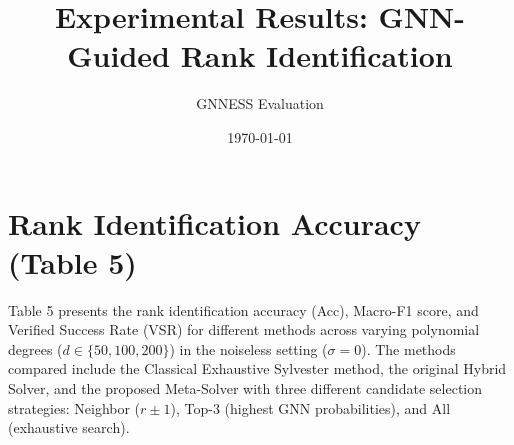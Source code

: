 \documentclass{article}
\begin{document}
\title{Experimental Results: GNN-Guided Rank Identification}
\author{GNNESS Evaluation}
\date{\today}
\maketitle

\section{Rank Identification Accuracy (Table 5)}

Table 5 presents the rank identification accuracy (Acc), Macro-F1 score, and Verified Success Rate (VSR) for different methods across varying polynomial degrees ($d \in \{50, 100, 200\}$) in the noiseless setting ($\sigma=0$). The methods compared include the Classical Exhaustive Sylvester method, the original Hybrid Solver, and the proposed Meta-Solver with three different candidate selection strategies: Neighbor ($r \pm 1$), Top-3 (highest GNN probabilities), and All (exhaustive search).

\begin{table}[ht]
\centering
\caption{Rank identification and verification results (test set, noiseless). Acc = rank accuracy; F1 = macro-F1; VSR = verified success rate. Report mean over 2000 samples.}
\label{tab:rank_identification}
\end{table}
\end{document}
